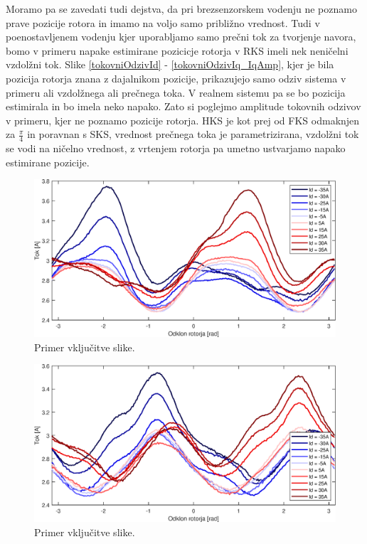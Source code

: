 \documentclass[a4paper,twoside,openright,12pt,slovene]{book}
\begin{document}
Moramo pa se zavedati tudi dejstva, da pri brezsenzorskem vodenju ne poznamo prave pozicije rotora in imamo na voljo samo približno vrednost. Tudi v poenostavljenem vodenju kjer uporabljamo samo
prečni tok za tvorjenje navora, bomo v primeru napake estimirane pozicicje rotorja v RKS imeli nek neničelni vzdolžni tok. Slike \ref{tokovniOdzivId} - \ref{tokovniOdzivIq_IqAmp}, kjer je bila
pozicija rotorja znana z dajalnikom pozicije, prikazujejo samo odziv sistema v primeru ali vzdolžnega ali prečnega toka. V realnem sistemu pa se bo pozicija estimirala in bo imela neko napako. Zato si
poglejmo amplitude tokovnih odzivov v primeru, kjer ne poznamo pozicije rotorja. HKS je kot prej od FKS odmaknjen za $\frac{\pi}{4}$ in poravnan s SKS, vrednost prečnega toka je parametrizirana, vzdolžni tok se vodi na
ničelno vrednost, z vrtenjem rotorja pa umetno ustvarjamo napako estimirane pozicije.

\begin{figure}[!htbp]
    \centering
    \includegraphics[width=1\columnwidth]{Slike/tokovniOdzivIs_IdAmp.eps}
    \caption{\label{tokovniOdzivIs_IdAmp} Primer vključitve slike.}
\end{figure}

\begin{figure}[!htbp]
    \centering
    \includegraphics[width=1\columnwidth]{Slike/tokovniOdzivIs_IqAmp.eps}
    \caption{\label{tokovniOdzivIs_IqAmp} Primer vključitve slike.}
\end{figure}
\end{document}
